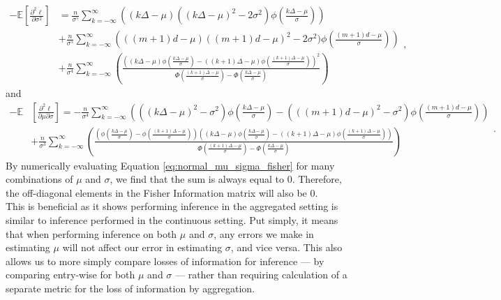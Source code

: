 \documentclass[11pt,a4,twosided,singlespacing,titlepagenumber=on,numbers=endperiod]{scrreprt}
\numberwithin{equation}{chapter} %
\theoremstyle{remark}
\begin{document}
\begin{equation}\label{eq:normal_sigma_fisher}
	\begin{aligned}
		-\mathbb{E}\left[\frac{\partial^2 \ell}{\partial \sigma^2}\right] &= \frac{n}{\sigma^5} \sum_{k=-\infty}^\infty  \left(
			(k \Delta - \mu)((k \Delta - \mu)^2 - 2 \sigma^2) \phi \left( \frac{k \Delta - \mu}{\sigma} \right)
		\right) \\
		&+ \frac{n}{\sigma^5} \sum_{k=-\infty}^\infty  \left(
			((m+1)d - \mu)((m+1)d - \mu)^2 - 2 \sigma^2) \phi \left( \frac{(m+1)d - \mu}{\sigma} \right)
		\right)\\
		&+ \frac{n}{\sigma^4} \sum_{k=-\infty}^\infty  \left(
			\frac{\left(
				(k \Delta - \mu) \phi \left( \frac{k \Delta - \mu}{\sigma} \right) - ((k + 1) \Delta - \mu)\phi \left( \frac{(k + 1) \Delta - \mu}{\sigma} \right)
			\right)^2}
			{\Phi \left( \frac{(k + 1) \Delta - \mu}{\sigma} \right) - \Phi \left(\frac{k \Delta - \mu}{\sigma} \right)}
		\right)
	\end{aligned},
\end{equation}
and
\begin{equation}\label{eq:normal_mu_sigma_fisher}
	\begin{aligned}
		-\mathbb{E}&\left[\frac{\partial^2 \ell}{\partial \mu \partial \sigma}\right] = -\frac{n}{\sigma^4}\sum_{k=-\infty}^\infty  \left(
			((k \Delta - \mu)^2 - \sigma^2) \phi \left( \frac{k \Delta - \mu}{\sigma} \right) - (((m+1)d - \mu)^2 - \sigma^2) \phi \left( \frac{(m+1)d - \mu}{\sigma} \right)
		\right) \\
		&+ \frac{n}{\sigma^3}\sum_{k=-\infty}^\infty  \left(
			\frac{\left(\phi \left( \frac{k \Delta - \mu}{\sigma} \right) - \phi \left( \frac{(k + 1) \Delta - \mu}{\sigma} \right)\right) \left( (k \Delta - \mu) \phi \left( \frac{k \Delta - \mu}{\sigma} \right) - ((k + 1) \Delta - \mu)\phi \left( \frac{(k + 1) \Delta - \mu}{\sigma} \right)\right)}
		 {\Phi \left( \frac{(k + 1) \Delta - \mu}{\sigma} \right) - \Phi \left(\frac{k \Delta - \mu}{\sigma} \right)}
		\right)
	\end{aligned}.
\end{equation}
By numerically evaluating Equation \ref{eq:normal_mu_sigma_fisher} for many combinations of $\mu$ and $\sigma$, we find that the sum is always equal to 0. Therefore, the off-diagonal elements in the Fisher Information matrix will also be 0. \\
This is beneficial as it shows performing inference in the aggregated setting is similar to inference performed in the continuous setting. Put simply, it means that when performing inference on both $\mu$ and $\sigma$, any errors we make in estimating $\mu$ will not affect our error in estimating $\sigma$, and vice versa. This also allows us to more simply compare losses of information for inference --- by comparing entry-wise for both $\mu$ and $\sigma$ --- rather than requiring calculation of a separate metric for the loss of information by aggregation. \\
\end{document}

